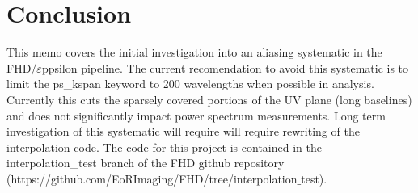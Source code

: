 \documentclass[linenumbers]{aastex631}
\newcommand\eppsilon{$\varepsilon$ppsilon\xspace}
\begin{document}
\section{Conclusion}
This memo covers the initial investigation into an aliasing systematic in the FHD/\eppsilon{} pipeline. The current recomendation to avoid this systematic is to limit the ps\_kspan keyword to 200 wavelengths when possible in analysis. Currently this cuts the sparsely covered portions of the UV plane (long baselines) and does not significantly impact power spectrum measurements. Long term investigation of this systematic will require will require rewriting of the interpolation code. 
The code for this project is contained in the interpolation\_test branch of the FHD github repository (https://github.com/EoRImaging/FHD/tree/interpolation$\_$test). 

\newpage
\end{document}
